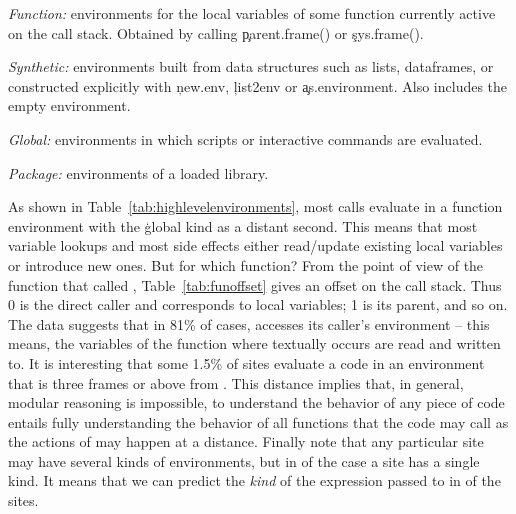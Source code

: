 \documentclass[review,screen,acmsmall,anonymous=true]{acmart}
\begin{document}
\begin{compactitem}[---]
\item \emph{Function:} environments for the local variables of some function
  currently active on the call stack. Obtained by calling \c{parent.frame()} or
  \c{sys.frame()}.
\item \emph{Synthetic:} environments built from data structures such as lists,
  dataframes, or constructed explicitly with \c{new.env}, \c{list2env} or
  \c{as.environment}. Also includes the empty environment.
\item \emph{Global:}  environments in which scripts or interactive commands
  are evaluated.
\item \emph{Package:}  environments of a loaded library.
\end{compactitem}

\noindent
As shown in Table~\ref{tab:highlevelenvironments}, most calls evaluate in a
function environment with the \c{global} kind as a distant second. This means
that most variable lookups and most side effects either read/update existing
local variables or introduce new ones. But for which function? From the point of
view of the function that called \eval, Table~\ref{tab:funoffset} gives an
offset on the call stack. Thus 0 is the direct caller and corresponds to local variables; 1 is its parent, and so on. The data suggests that in 81\% of cases, \eval accesses its caller's environment -- this means, the variables of the function where \eval textually
occurs are read and written to. It is interesting that some 1.5\% of sites
evaluate a code in an environment that is three frames or above from \eval. This
distance implies that, in general, modular reasoning is impossible, to
understand the behavior of any piece of code entails fully understanding the
behavior of all functions that the code may call as the actions of \eval may
happen at a distance. Finally note that any particular site may have several
kinds of environments, but in \packageNbOneCategoryEnvirSitePercent of the case a
site has a single kind. It means that we can predict the \emph{kind} of the expression passed to \eval in \packageNbOneCategoryEnvirSitePercent of the sites.
\end{document}
